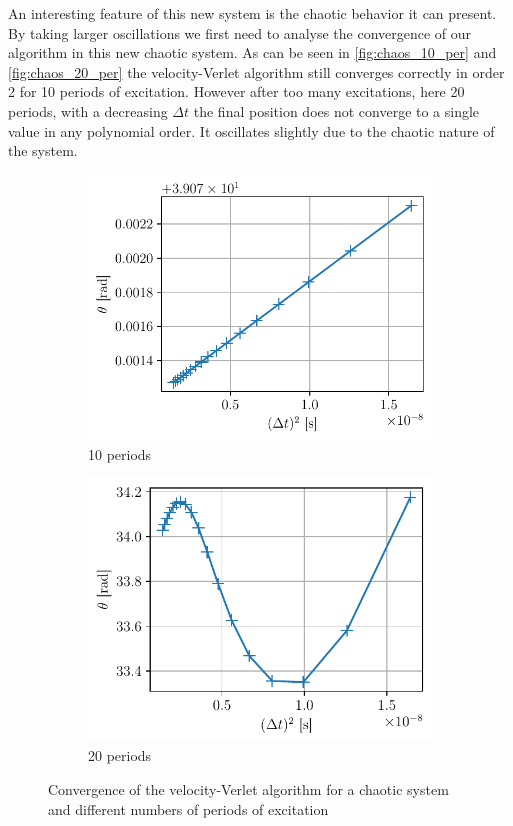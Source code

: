 An interesting feature of this new system is the chaotic behavior it can present. By taking larger oscillations we first need to analyse the convergence of our algorithm in this new chaotic system. As can be seen in \autoref{fig:chaos_10_per} and \autoref{fig:chaos_20_per} the velocity-Verlet algorithm still converges correctly in order 2 for 10 periods of excitation. However after too many excitations, here 20 periods, with a decreasing $\Delta t$ the final position does not converge to a single value in any polynomial order. It oscillates slightly due to the chaotic nature of the system.
\begin{figure}[h]
    \centering
    \begin{subfigure}{0.48\linewidth}
        \centering
        \includegraphics[width=\linewidth]{figures/chaos1_10_periods_conv.pdf}
        \caption{10 periods}
        \label{fig:chaos_10_per}
    \end{subfigure}
    \begin{subfigure}{0.48\linewidth}
        \centering
        \includegraphics[width=\linewidth]{figures/chaos1_20_periods_conv.pdf}
        \caption{20 periods}
        \label{fig:chaos_20_per}
    \end{subfigure}
    \caption{Convergence of the velocity-Verlet algorithm for a chaotic system and different numbers of periods of excitation}
\end{figure}

